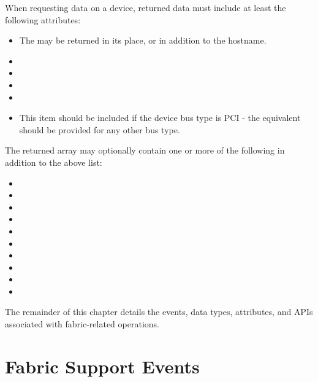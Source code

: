 When requesting data on a device, returned data must include at least the following attributes:

\begin{itemize}
    \item {} The  may be returned in its place, or in addition to the hostname.
    \pasteAttributeItemEnd
    \item {}
    \item {}
    \item {}
    \item {}
    \item {} This item should be included if the device bus type is \ac{PCI} - the equivalent should be provided for any other bus type.
    \pasteAttributeItemEnd
\end{itemize}

The returned array may optionally contain one or more of the following in addition to the above list:

\begin{itemize}
    \item {}
    \item {}
    \item {}
    \item {}
    \item {}
    \item {}
    \item {}
    \item {}
    \item {}
    \item {}
\end{itemize}


The remainder of this chapter details the events, data types, attributes, and \acp{API} associated with fabric-related operations.


\section{Fabric Support Events}
\label{api:sched:consts}

